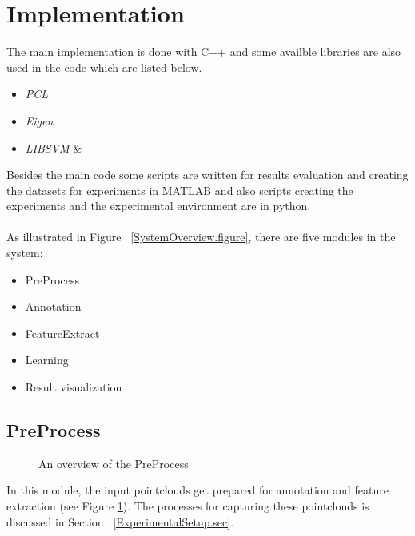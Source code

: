 % 
% 


\section{Implementation}

The main implementation is done with C++ and some availble libraries are also used in the code which are listed below.   

\begin{itemize}
 \item {\it PCL} \cite{Rusu_ICRA2011_PCL}
 \item {\it Eigen} \cite{eigenweb}
 \item {\it LIBSVM} \cite{LIBSVM} \& \cite{li2010holistic}
\end{itemize}

Besides the main code some scripts are written for results evaluation and creating the datasets for experiments in MATLAB and also 
scripts creating the experiments and the experimental environment are in python.\\
\\
As illustrated in Figure ~\ref{SystemOverview.figure}, there are five modules in the system:

\begin{itemize}
  \item PreProcess
  \item Annotation
  \item FeatureExtract
  \item Learning
  \item Result visualization
\end{itemize}

\subsection{PreProcess}
\label{PreProcess.ssec}

\begin{figure}[t]
  \caption[PreProcess overview]
  {An overview of the PreProcess}
  \label{PreProcessFlowchart.figure}
\end{figure}

 In this module, the input pointclouds get prepared for annotation and feature extraction (see Figure \ref{PreProcessFlowchart.figure}).
 The processes for capturing these pointclouds is discussed in Section ~\ref{ExperimentalSetup.sec}. 
 
